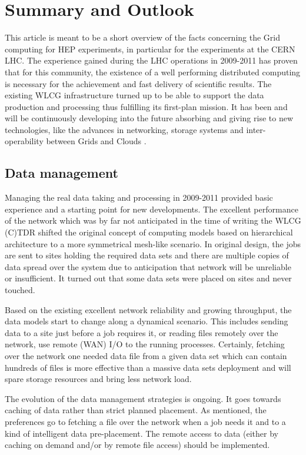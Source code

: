 
\section{Summary and Outlook}

This article is meant to be a short overview of the facts concerning
the Grid computing for HEP experiments, in particular for the
experiments at the CERN LHC. The experience gained during the LHC
operations in 2009-2011 has proven that for this community, the
existence of a well performing distributed computing is necessary
for the achievement and fast delivery of scientific results. The
existing WLCG infrastructure turned up to be able to support the
data production and processing thus fulfilling its first-plan
mission. It has been and will be continuously developing into the
future absorbing and giving rise to new technologies, like the
advances in networking, storage systems and inter-operability
between Grids and Clouds \cite{Cloud}\cite{Cloud2}.

\subsection{Data management}

Managing the real data taking and processing in
2009-2011 provided basic experience and a starting point for new
developments. The excellent performance of the network which was by
far not anticipated in the time of writing the WLCG (C)TDR shifted
the original concept of computing models based on hierarchical
architecture to a more symmetrical mesh-like scenario. In original
design, the jobs are sent to sites holding the required data sets
and there are multiple copies of data spread over the system due to
anticipation that network will be unreliable or insufficient. It
turned out that some data sets were placed on sites and never
touched.

Based on the existing excellent network reliability and growing
throughput, the data models start to change along a dynamical
scenario. This includes sending data to a site just before a job
requires it, or reading files remotely over the network, use remote
(WAN) I/O to the running processes. Certainly, fetching over the
network one needed data file from a given data set which can contain
hundreds of files is more effective than a massive data sets
deployment and will spare storage resources and bring less network
load.

The evolution of the data management strategies is ongoing. It goes
towards caching of data rather than strict planned placement. As
mentioned, the preferences go to fetching a file over the network
when a job needs it and to a kind of intelligent data pre-placement.
The remote access to data (either by caching on demand and/or by
remote file access) should be implemented.


